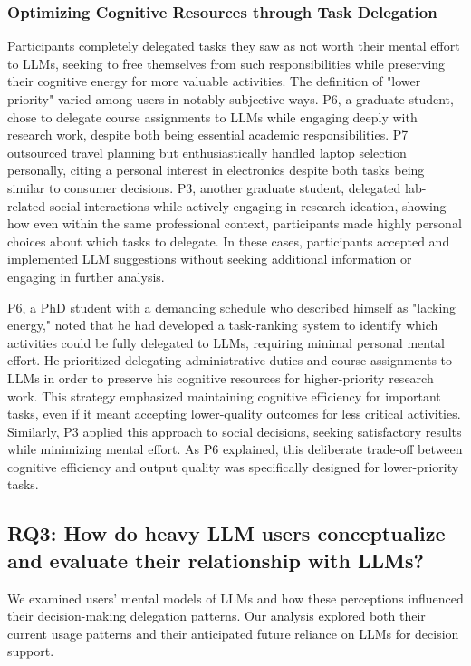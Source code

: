 \subsubsection{Optimizing Cognitive Resources through Task Delegation}
Participants completely delegated tasks they saw as not worth their mental effort to LLMs, seeking to free themselves from such responsibilities while preserving their cognitive energy for more valuable activities. The definition of "lower priority" varied among users in notably subjective ways. P6, a graduate student, chose to delegate course assignments to LLMs while engaging deeply with research work, despite both being essential academic responsibilities. P7 outsourced travel planning but enthusiastically handled laptop selection personally, citing a personal interest in electronics despite both tasks being similar to consumer decisions. P3, another graduate student, delegated lab-related social interactions while actively engaging in research ideation, showing how even within the same professional context, participants made highly personal choices about which tasks to delegate. In these cases, participants accepted and implemented LLM suggestions without seeking additional information or engaging in further analysis.

P6, a PhD student with a demanding schedule who described himself as "lacking energy," noted that he had developed a task-ranking system to identify which activities could be fully delegated to LLMs, requiring minimal personal mental effort. He prioritized delegating administrative duties and course assignments to LLMs in order to preserve his cognitive resources for higher-priority research work. This strategy emphasized maintaining cognitive efficiency for important tasks, even if it meant accepting lower-quality outcomes for less critical activities. Similarly, P3 applied this approach to social decisions, seeking satisfactory results while minimizing mental effort. As P6 explained, this deliberate trade-off between cognitive efficiency and output quality was specifically designed for lower-priority tasks.

\subsection{RQ3: How do heavy LLM users conceptualize and evaluate their relationship with LLMs?}
We examined users' mental models of LLMs and how these perceptions influenced their decision-making delegation patterns. Our analysis explored both their current usage patterns and their anticipated future reliance on LLMs for decision support.

